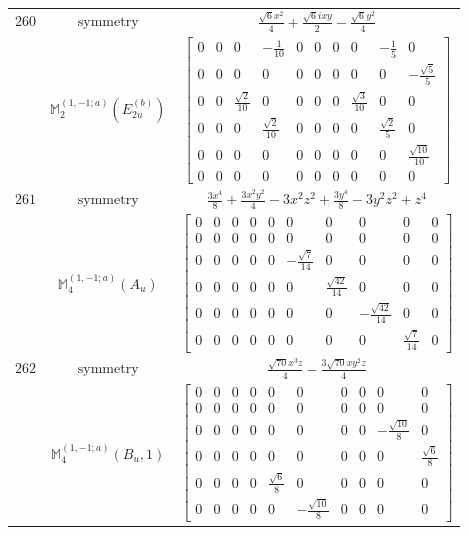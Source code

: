 \documentclass[fleqn,8pt,landscape]{jsarticle}
\begin{document}
\begin{longtable}{ccc}
$ 260 $ & $ \text{symmetry} $ & $ \frac{\sqrt{6} x^{2}}{4} + \frac{\sqrt{6} i x y}{2} - \frac{\sqrt{6} y^{2}}{4} $ \\
$  $ & $ \mathbb{M}_{2}^{(1,-1;a)}(E_{2u}^{(b)}) $ & $ \begin{bmatrix} 0 & 0 & 0 & - \frac{1}{10} & 0 & 0 & 0 & 0 & - \frac{1}{5} & 0 \\ 0 & 0 & 0 & 0 & 0 & 0 & 0 & 0 & 0 & - \frac{\sqrt{5}}{5} \\ 0 & 0 & \frac{\sqrt{2}}{10} & 0 & 0 & 0 & 0 & \frac{\sqrt{3}}{10} & 0 & 0 \\ 0 & 0 & 0 & \frac{\sqrt{2}}{10} & 0 & 0 & 0 & 0 & \frac{\sqrt{2}}{5} & 0 \\ 0 & 0 & 0 & 0 & 0 & 0 & 0 & 0 & 0 & \frac{\sqrt{10}}{10} \\ 0 & 0 & 0 & 0 & 0 & 0 & 0 & 0 & 0 & 0 \end{bmatrix} $ \\ \hline
$ 261 $ & $ \text{symmetry} $ & $ \frac{3 x^{4}}{8} + \frac{3 x^{2} y^{2}}{4} - 3 x^{2} z^{2} + \frac{3 y^{4}}{8} - 3 y^{2} z^{2} + z^{4} $ \\
$  $ & $ \mathbb{M}_{4}^{(1,-1;a)}(A_{u}) $ & $ \begin{bmatrix} 0 & 0 & 0 & 0 & 0 & 0 & 0 & 0 & 0 & 0 \\ 0 & 0 & 0 & 0 & 0 & 0 & 0 & 0 & 0 & 0 \\ 0 & 0 & 0 & 0 & 0 & - \frac{\sqrt{7}}{14} & 0 & 0 & 0 & 0 \\ 0 & 0 & 0 & 0 & 0 & 0 & \frac{\sqrt{42}}{14} & 0 & 0 & 0 \\ 0 & 0 & 0 & 0 & 0 & 0 & 0 & - \frac{\sqrt{42}}{14} & 0 & 0 \\ 0 & 0 & 0 & 0 & 0 & 0 & 0 & 0 & \frac{\sqrt{7}}{14} & 0 \end{bmatrix} $ \\ \hline
$ 262 $ & $ \text{symmetry} $ & $ \frac{\sqrt{70} x^{3} z}{4} - \frac{3 \sqrt{70} x y^{2} z}{4} $ \\
$  $ & $ \mathbb{M}_{4}^{(1,-1;a)}(B_{u},1) $ & $ \begin{bmatrix} 0 & 0 & 0 & 0 & 0 & 0 & 0 & 0 & 0 & 0 \\ 0 & 0 & 0 & 0 & 0 & 0 & 0 & 0 & 0 & 0 \\ 0 & 0 & 0 & 0 & 0 & 0 & 0 & 0 & - \frac{\sqrt{10}}{8} & 0 \\ 0 & 0 & 0 & 0 & 0 & 0 & 0 & 0 & 0 & \frac{\sqrt{6}}{8} \\ 0 & 0 & 0 & 0 & \frac{\sqrt{6}}{8} & 0 & 0 & 0 & 0 & 0 \\ 0 & 0 & 0 & 0 & 0 & - \frac{\sqrt{10}}{8} & 0 & 0 & 0 & 0 \end{bmatrix} $ \\ \hline

\end{longtable}
\end{document}
